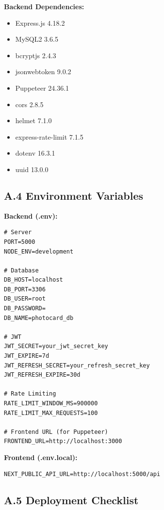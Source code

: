 \documentclass[12pt,a4paper]{article}
\begin{document}
\textbf{Backend Dependencies:}
\begin{itemize}
    \item Express.js 4.18.2
    \item MySQL2 3.6.5
    \item bcryptjs 2.4.3
    \item jsonwebtoken 9.0.2
    \item Puppeteer 24.36.1
    \item cors 2.8.5
    \item helmet 7.1.0
    \item express-rate-limit 7.1.5
    \item dotenv 16.3.1
    \item uuid 13.0.0
\end{itemize}

\subsection*{A.4 Environment Variables}

\textbf{Backend (.env):}
\begin{verbatim}
# Server
PORT=5000
NODE_ENV=development

# Database
DB_HOST=localhost
DB_PORT=3306
DB_USER=root
DB_PASSWORD=
DB_NAME=photocard_db

# JWT
JWT_SECRET=your_jwt_secret_key
JWT_EXPIRE=7d
JWT_REFRESH_SECRET=your_refresh_secret_key
JWT_REFRESH_EXPIRE=30d

# Rate Limiting
RATE_LIMIT_WINDOW_MS=900000
RATE_LIMIT_MAX_REQUESTS=100

# Frontend URL (for Puppeteer)
FRONTEND_URL=http://localhost:3000
\end{verbatim}

\textbf{Frontend (.env.local):}
\begin{verbatim}
NEXT_PUBLIC_API_URL=http://localhost:5000/api
\end{verbatim}

\subsection*{A.5 Deployment Checklist}
\end{document}
